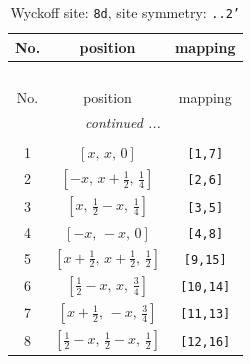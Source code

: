 \documentclass[fleqn,8pt]{jsarticle}
\begin{document}
\begin{longtable}{ccc}
\caption{Wyckoff site: {\tt 8d}, site symmetry: {\tt ..2'}}
 \\
 \hline \hline
No. & position & mapping \\ \hline \endfirsthead

\multicolumn{2}{l}{\tablename\ \thetable{}} \\
 \hline \hline
No. & position & mapping \\ \hline \endhead

 \hline \hline
\multicolumn{2}{r}{\footnotesize\it continued ...} \\ \endfoot

 \hline \hline
\multicolumn{2}{r}{} \\ \endlastfoot

1 & $\left[ x,\, x,\, 0 \right]$ & {\tt [1,7]} \\ \hline
2 & $\left[ - x,\, x + \frac{1}{2},\, \frac{1}{4} \right]$ & {\tt [2,6]} \\ \hline
3 & $\left[ x,\, \frac{1}{2} - x,\, \frac{1}{4} \right]$ & {\tt [3,5]} \\ \hline
4 & $\left[ - x,\, - x,\, 0 \right]$ & {\tt [4,8]} \\ \hline
5 & $\left[ x + \frac{1}{2},\, x + \frac{1}{2},\, \frac{1}{2} \right]$ & {\tt [9,15]} \\ \hline
6 & $\left[ \frac{1}{2} - x,\, x,\, \frac{3}{4} \right]$ & {\tt [10,14]} \\ \hline
7 & $\left[ x + \frac{1}{2},\, - x,\, \frac{3}{4} \right]$ & {\tt [11,13]} \\ \hline
8 & $\left[ \frac{1}{2} - x,\, \frac{1}{2} - x,\, \frac{1}{2} \right]$ & {\tt [12,16]} \\
\end{longtable}
\renewcommand{\arraystretch}{1.2}
\end{document}
